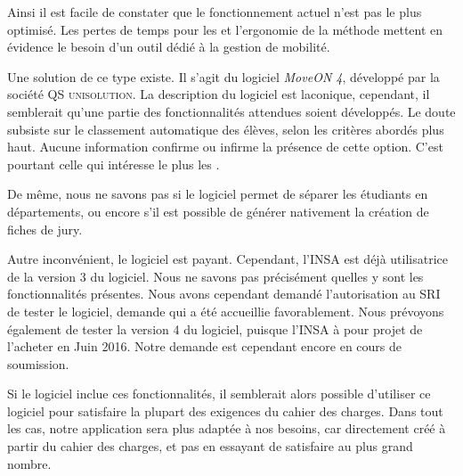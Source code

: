 \bigbreak 

Ainsi il est facile de constater que le fonctionnement actuel n'est pas le plus optimisé. Les pertes de temps pour les \ris et l'ergonomie de la méthode mettent en évidence le besoin d'un outil dédié à la gestion de mobilité. 

Une solution de ce type existe. Il s'agit du logiciel \textit{MoveON 4}, développé par la société \textsc{QS unisolution}. La description du logiciel est laconique, cependant, il semblerait qu'une partie des fonctionnalités attendues soient développés. Le doute subsiste sur le classement automatique des élèves, selon les critères abordés plus haut. Aucune information confirme ou infirme la présence de cette option. C'est pourtant celle qui intéresse le plus les \ris.

De même, nous ne savons pas si le logiciel permet de séparer les étudiants en départements, ou encore s'il est possible de générer nativement la création de fiches de jury. 

Autre inconvénient, le logiciel est payant. Cependant, l'INSA est déjà utilisatrice de la version 3 du logiciel. 
Nous ne savons pas précisément quelles y sont les fonctionnalités présentes. Nous avons cependant demandé l'autorisation au SRI de tester le logiciel, demande qui a été accueillie favorablement. Nous prévoyons également de tester la version 4 du logiciel, puisque l'INSA à pour projet de l'acheter en Juin 2016. Notre demande est cependant encore en cours de soumission. 


Si le logiciel inclue ces fonctionnalités, il semblerait alors possible d'utiliser ce logiciel pour satisfaire la plupart des exigences du cahier des charges. Dans tout les cas, notre application sera plus adaptée à nos besoins, car directement créé à partir du cahier des charges, et pas en essayant de satisfaire au plus grand nombre. 
